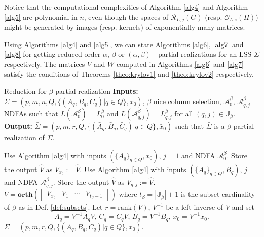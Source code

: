 \documentclass[journal]{IEEEtran}
\newcommand{\Rank}{\mathrm{rank}}
\begin{document}
Notice that the computational complexities of Algorithm \ref{alg4} and Algorithm \ref{alg5} are polynomial in $n$, even though the spaces of $\mathscr{R}_{L,j}(G)$ (resp. $\mathscr{O}_{L,i}(H)$) might be generated by images (resp. kernels) of exponentially many matrices.

Using Algorithms \ref{alg4} and \ref{alg5}, we can state Algorithms \ref{alg6}, \ref{alg7} and \ref{alg8} for getting reduced order $\alpha$, $\beta$ or $(\alpha,\beta)$ - partial realizations for an LSS $\Sigma$ respectively. The matrices $V$ and $W$ computed in Algorithms \ref{alg6} and \ref{alg7} satisfy the conditions of Theorems \ref{theo:krylov1} and \ref{theo:krylov2} respectively.

\begin{algorithm}
	\caption{Reduction for $\beta$-partial realization
		\newpage 
		\textbf{Inputs:} $\Sigma=(p,m,n,Q,\{(A_q,B_q,C_q)|q \in Q\},x_0)$, $\beta$ nice column selection, $\mathcal{A}^{\beta}_{0}$, $\mathcal{A}^{\beta}_{q,j}$ NDFAs such that $L(\mathcal{A}^{\beta}_{0})=L^\beta_0$ and $L(\mathcal{A}^{\beta}_{q,j})=L^\beta_{q,j}$ for all $(q,j) \in \mathbb{J}_\beta$.
		\newpage  
		\textbf{Output:} $\bar{\Sigma}=(p,m,r,Q,\{(\bar{A}_q,\bar{B}_q,\bar{C}_q)|q \in Q\},\bar{x}_0)$ such that $\bar{\Sigma}$ is a $\beta$-partial realization of $\Sigma$.
	}
	\label{alg6}
	\begin{algorithmic}[1]
		\STATE Use Algorithm \ref{alg4} with inputs $(\{A_q\}_{q \in Q},x_0)$, $j=1$ and NDFA $\mathcal{A}^\beta_0$. Store the output $\hat{V}$ as $V_{x_0}:=\hat{V}$.
		\STATE  Use Algorithm \ref{alg4} with inputs $(\{A_q\}_{q \in Q},B_q)$, $j$ and NDFA $\mathcal{A}^\beta_{q,j}$.  Store the output $\hat{V}$ as $V_{q,j}:=\hat{V}$.
		\ENDFOR
		\STATE $V=\mathbf{orth}(\begin{bmatrix} V_{x_0} & V_1 & \cdots & V_{t_{\beta}-1} \end{bmatrix})$ where $t_\beta= |\mathbb{J}_\beta|+1$ is the subset cardinality of $\beta$ as in Def. \ref{def:subsets}.
		\STATE
		Let $r=\Rank (V)$, $V^{-1}$ be a left inverse of $V$ and set
		\[
		\bar{A}_q=V^{-1}A_qV \mbox{, } \bar{C}_q=C_qV \mbox{, } \bar{B}_q=V^{-1}B_q \mbox{, } \bar{x}_0=V^{-1}x_0.
		\]
		\RETURN $\bar{\Sigma}=(p,m,r,Q,\{(\bar{A}_q,\bar{B}_q,\bar{C}_q)|q \in Q\},\bar{x}_0)$.
    \end{algorithmic}
\end{algorithm}
\end{document}
